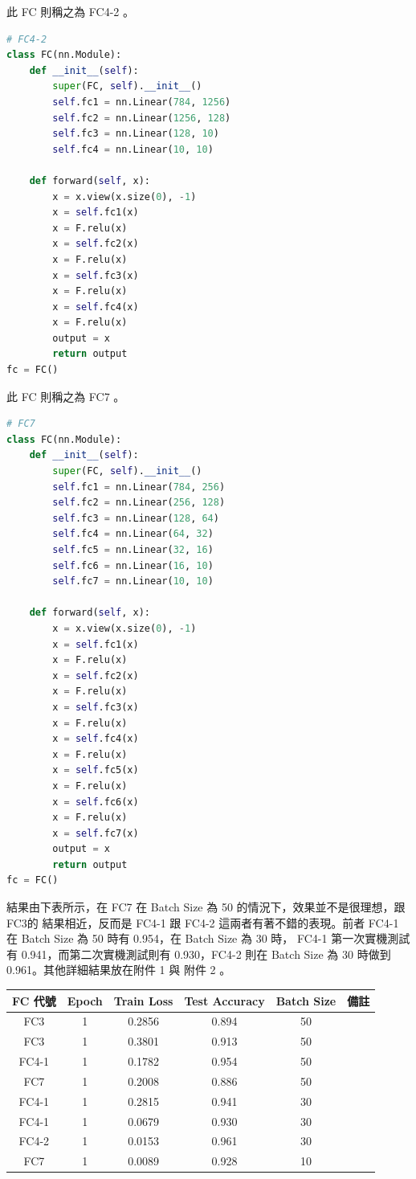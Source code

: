 \documentclass[11pt,UTF8]{ctexart}
\begin{document}
此 FC 則稱之為 FC4-2 。

	\begin{lstlisting}[language={python}]
# FC4-2
class FC(nn.Module):
    def __init__(self):
        super(FC, self).__init__()
        self.fc1 = nn.Linear(784, 1256)
        self.fc2 = nn.Linear(1256, 128)
        self.fc3 = nn.Linear(128, 10)
        self.fc4 = nn.Linear(10, 10)

    def forward(self, x):
        x = x.view(x.size(0), -1)
        x = self.fc1(x)
        x = F.relu(x)
        x = self.fc2(x)
        x = F.relu(x)
        x = self.fc3(x)
        x = F.relu(x)
        x = self.fc4(x)
        x = F.relu(x)
        output = x
        return output
fc = FC()
	\end{lstlisting}

此 FC 則稱之為 FC7 。

	\begin{lstlisting}[language={python}]
# FC7
class FC(nn.Module):
    def __init__(self):
        super(FC, self).__init__()
        self.fc1 = nn.Linear(784, 256)
        self.fc2 = nn.Linear(256, 128)
        self.fc3 = nn.Linear(128, 64)
        self.fc4 = nn.Linear(64, 32)
        self.fc5 = nn.Linear(32, 16)
        self.fc6 = nn.Linear(16, 10)
        self.fc7 = nn.Linear(10, 10)

    def forward(self, x):
        x = x.view(x.size(0), -1)
        x = self.fc1(x)
        x = F.relu(x)
        x = self.fc2(x)
        x = F.relu(x)
        x = self.fc3(x)
        x = F.relu(x)
        x = self.fc4(x)
        x = F.relu(x)
        x = self.fc5(x)
        x = F.relu(x)
        x = self.fc6(x)
        x = F.relu(x)
        x = self.fc7(x)
        output = x
        return output
fc = FC()
	\end{lstlisting}
	
結果由下表所示，在 FC7 在 Batch Size 為 50 的情況下，效果並不是很理想，跟 FC3的 結果相近，反而是 FC4-1 跟 FC4-2 這兩者有著不錯的表現。前者 FC4-1 在 Batch Size 為 50 時有 0.954，在 Batch Size 為 30 時， FC4-1 第一次實機測試有 0.941，而第二次實機測試則有 0.930，FC4-2 則在 Batch Size 為 30 時做到 0.961。其他詳細結果放在附件 1 與 附件 2 。

\begin{center}
\begin{tabular}{cccccc}
\hline
FC 代號 & Epoch & Train Loss & Test Accuracy & Batch Size & 備註 \\
\hline
FC3 & 1 & 0.2856 & 0.894 & 50 &  \\
FC3 & 1 & 0.3801 & 0.913 & 50 &  \\
FC4-1 & 1 & 0.1782 & 0.954  & 50 & \\
FC7 & 1 & 0.2008 & 0.886 & 50 & \\
FC4-1 & 1 & 0.2815 & 0.941 & 30 & \\
FC4-1 & 1 & 0.0679 & 0.930 & 30 & \\
FC4-2 & 1 & 0.0153 & 0.961 & 30 & \\
FC7 & 1 & 0.0089 & 0.928 & 10 & \\
\hline
\end{tabular}
\end{center}
\end{document}
